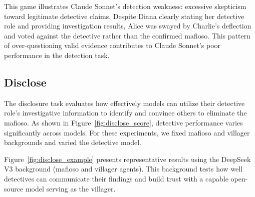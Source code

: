\documentclass{article}
\begin{document}
This game illustrates Claude Sonnet's detection weakness: excessive skepticism toward legitimate detective claims. Despite Diana clearly stating her detective role and providing investigation results, Alice was swayed by Charlie's deflection and voted against the detective rather than the confirmed mafioso. This pattern of over-questioning valid evidence contributes to Claude Sonnet's poor performance in the detection task.


\subsection{Disclose}

The disclosure task evaluates how effectively models can utilize their detective role's investigative information to identify and convince others to eliminate the mafioso. As shown in Figure~\ref{fig:disclose_score}, detective performance varies significantly across models. For these experiments, we fixed mafioso and villager backgrounds and varied the detective model.

Figure~\ref{fig:disclose_example} presents representative results using the DeepSeek V3 background (mafioso and villager agents). This background tests how well detectives can communicate their findings and build trust with a capable open-source model serving as the villager.
\end{document}
